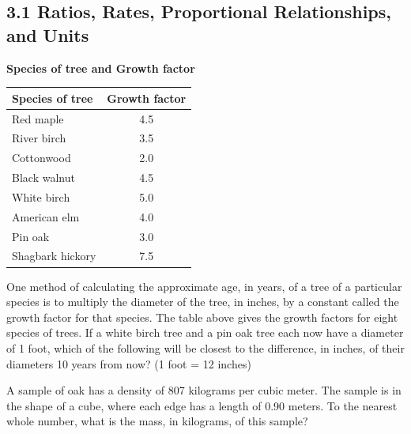\subsection*{3.1 Ratios, Rates, Proportional Relationships, and Units}
\noindent\markforreview
\vspace{1em}

\textbf{Species of tree and Growth factor}
\begin{center}
    

\begin{tabular}{|l|c|}
\hline
\textbf{Species of tree} & \textbf{Growth factor} \\
\hline
Red maple & 4.5 \\
River birch & 3.5 \\
Cottonwood & 2.0 \\
Black walnut & 4.5 \\
White birch & 5.0 \\
American elm & 4.0 \\
Pin oak & 3.0 \\
Shagbark hickory & 7.5 \\
\hline
\end{tabular}
\end{center}

\vspace{1em}

One method of calculating the approximate age, in years, of a tree of a particular species is to multiply the diameter of the tree, in inches, by a constant called the growth factor for that species.  
The table above gives the growth factors for eight species of trees.  
If a white birch tree and a pin oak tree each now have a diameter of 1 foot, which of the following will be closest to the difference, in inches, of their diameters 10 years from now?  
(1 foot = 12 inches)

\vspace{0.75em}


\newpage

\noindent\markforreview
\vspace{1em}

A sample of oak has a density of 807 kilograms per cubic meter.  
The sample is in the shape of a cube, where each edge has a length of 0.90 meters.  
To the nearest whole number, what is the mass, in kilograms, of this sample?

\vspace{0.75em}

